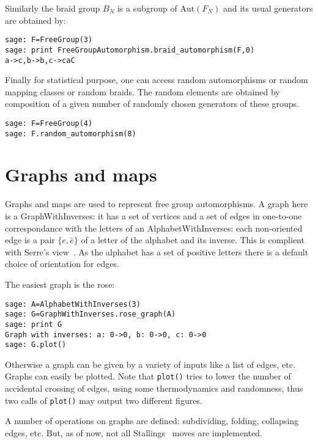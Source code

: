 \documentclass[10pt,a4paper]{article}
\newcommand{\Aut}{\text{Aut}}
\newcommand{\FN}{F_N}
\begin{document}
Similarly the braid group $B_N$ is a subgroup of $\Aut(\FN)$ and its usual generators are obtained by:
\begin{verbatim}
sage: F=FreeGroup(3)
sage: print FreeGroupAutomorphism.braid_automorphism(F,0)
a->c,b->b,c->caC
\end{verbatim}

Finally for statistical purpose, one can access random
automorphisms or random mapping
classes or random braids. The random elements are obtained by composition of a given
number of randomly chosen generators of these groups.
\begin{verbatim}
sage: F=FreeGroup(4)
sage: F.random_automorphism(8)
\end{verbatim}


\section{Graphs and maps}

Graphs and maps are used to represent free group automorphisms. A
graph here is a GraphWithInverses: it has a set of vertices and a set
of edges in one-to-one correspondance with the letters of an
AlphabetWithInverses: each non-oriented edge is a pair $\{e,\bar e\}$
of a letter of the alphabet and its inverse. This is complient with
Serre's view~\cite{serre-arbres,serre-trees}. As the alphabet has a set of positive letters there is a
default choice of orientation for edges.

The easiest graph is the rose:
\begin{verbatim}
sage: A=AlphabetWithInverses(3)
sage: G=GraphWithInverses.rose_graph(A)
sage: print G
Graph with inverses: a: 0->0, b: 0->0, c: 0->0
sage: G.plot()
\end{verbatim}
Otherwise a graph can be given by a variety of inputs like a list of
edges, etc. Graphs can easily be plotted. Note that
\texttt{plot()} tries to lower the number of accidental crossing of
edges, using some thermodynamics and randomness, thus two calls of
\texttt{plot()} may output two different figures.

A number of operations on graphs are defined: subdividing, folding,
collapsing edges, etc. But, as of now, not all
Stallings~\cite{stall-graphs} moves are implemented.
\end{document}
